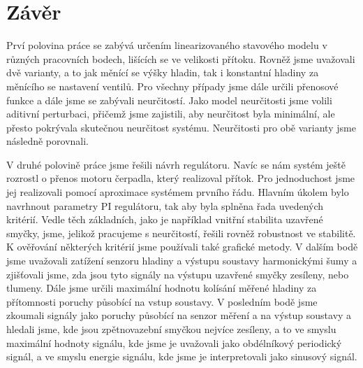 \documentclass[a4paper,11pt]{article}
\begin{document}



\newpage 
\section{Závěr}
Prví polovina práce se zabývá určením linearizovaného stavového modelu v různých pracovních bodech, lišících se ve velikosti přítoku. Rovněž jsme uvažovali dvě varianty, a to jak měnící se výšky hladin, tak i konstantní hladiny za měnícího se nastavení ventilů. Pro všechny případy jsme dále určili přenosové funkce a dále jsme se zabývali neurčitostí. Jako model neurčitosti jsme volili aditivní perturbaci, přičemž jsme zajistili, aby neurčitost byla minimální, ale přesto pokrývala skutečnou neurčitost systému. Neurčitosti pro obě varianty jsme následně porovnali.

V druhé polovině práce jsme řešili návrh regulátoru. Navíc se nám systém ještě rozrostl o přenos motoru čerpadla, který realizoval přítok. Pro jednoduchost jsme jej realizovali pomocí aproximace systémem prvního řádu. Hlavním úkolem bylo navrhnout parametry PI regulátoru, tak aby byla splněna řada uvedených kritérií. Vedle těch základních, jako je například vnitřní stabilita uzavřené smyčky, jsme, jelikož pracujeme s neurčitostí, řešili rovněž robustnost ve stabilitě. K ověřování některých kritérií jsme používali také grafické metody. V dalším bodě jsme uvažovali zatížení senzoru hladiny a výstupu soustavy harmonickými šumy a zjišťovali jsme, zda jsou tyto signály na výstupu uzavřené smyčky zesíleny, nebo tlumeny. Dále jsme určili maximální hodnotu kolísání měřené hladiny za přítomnosti poruchy působící na vstup soustavy. V posledním bodě jsme zkoumali signály jako poruchy působící na senzor měření a na výstup soustavy a hledali jsme, kde jsou zpětnovazební smyčkou nejvíce zesíleny, a to ve smyslu maximální hodnoty signálu, kde jsme je uvažovali jako obdélníkový periodický signál, a ve smyslu energie signálu, kde jsme je interpretovali jako sinusový signál.
\end{document}
